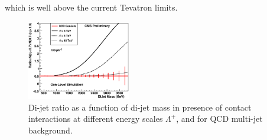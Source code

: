 \documentclass{cimento}
\begin{document}
which is well above the current Tevatron limits.
%
\begin{figure}[htbp] 
\centering
\includegraphics[width=0.4\textwidth]{DiJetRatio100pbOptFix.eps}
\caption{%
Di-jet ratio as a function of di-jet mass in presence of 
contact interactions at different energy scales $\Lambda^{+}$, 
and for QCD multi-jet background. 
}
\label{fig:DiJetRatioAndLQMej}
\end{figure}
%
\end{document}
